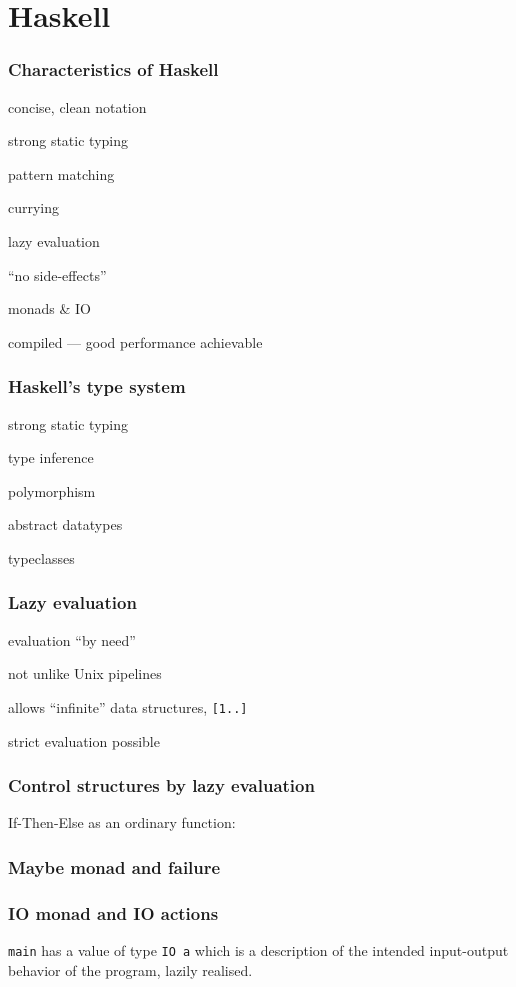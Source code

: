\section{Haskell}

\begin{frame}
\frametitle{Characteristics of Haskell}
\bi
\item concise, clean notation
\item strong static typing
\item pattern matching
\item currying
\item lazy evaluation
\item ``no side-effects''
\item monads \& IO
\item compiled --- good performance achievable
\ei
\end{frame}

\begin{frame}
\frametitle{Haskell's type system}
\bi
\item strong static typing
\item type inference
\item polymorphism
\item abstract datatypes
\item typeclasses
\ei
\end{frame}

\begin{frame}
\frametitle{Lazy evaluation}
\bi
\item evaluation ``by need''
\item not unlike Unix pipelines
\item allows ``infinite'' data structures, \texttt{[1..]}
\item strict evaluation possible
\ei
\end{frame}

\begin{frame}
\frametitle{Control structures by lazy evaluation}
If-Then-Else as an ordinary function:

\end{frame}

\begin{frame}
\frametitle{Maybe monad and failure}

\end{frame}

\begin{frame}
\frametitle{IO monad and IO actions}

\texttt{main} has a value of type \texttt{IO~a} which is a
description of the intended input-output behavior of the
program, lazily realised.
\end{frame}

